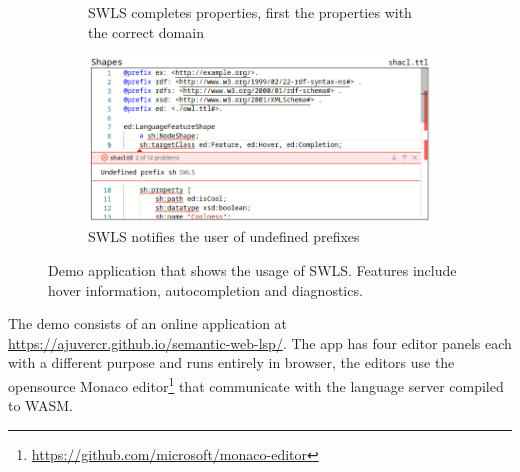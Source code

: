 \begin{figure}[tb]
\begin{subfigure}{0.48\textwidth}
      \caption{SWLS completes properties, first the properties with the correct domain}
      \label{property_completion}
    \end{subfigure}
    \hfill
    \begin{subfigure}{0.48\textwidth}
      \includegraphics[width=\textwidth]{./images/undefined.png}
      \caption{SWLS notifies the user of undefined prefixes}
      \label{undefined_prefix}
    \end{subfigure}
    \caption{
      Demo application that shows the usage of SWLS. Features include hover information, autocompletion and diagnostics.
    }\label{lst:Demo}
\end{figure}

The demo consists of an online application at \url{https://ajuvercr.github.io/semantic-web-lsp/}.
The app has four editor panels each with a different purpose and runs entirely in browser, the editors use the opensource Monaco editor\footnote{\url{https://github.com/microsoft/monaco-editor}}
that communicate with the language server compiled to WASM.
%

